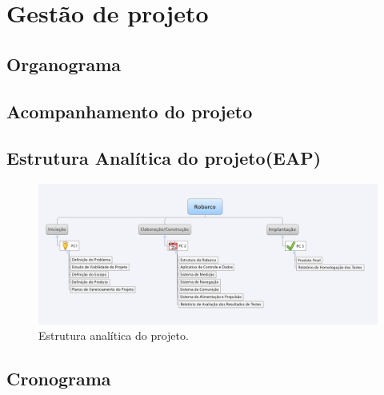 \chapter[Gestão de projeto]{Gestão de projeto}

\section{Organograma}
\section{Acompanhamento do projeto}
\section{Estrutura Analítica do projeto(EAP)}

 \begin{figure} [!htp]
	\centering
	\includegraphics[scale=0.55]{figuras/EAPPI}
	\caption{Estrutura analítica do projeto.}
	\label{EAP}
\end{figure}
\section{Cronograma}